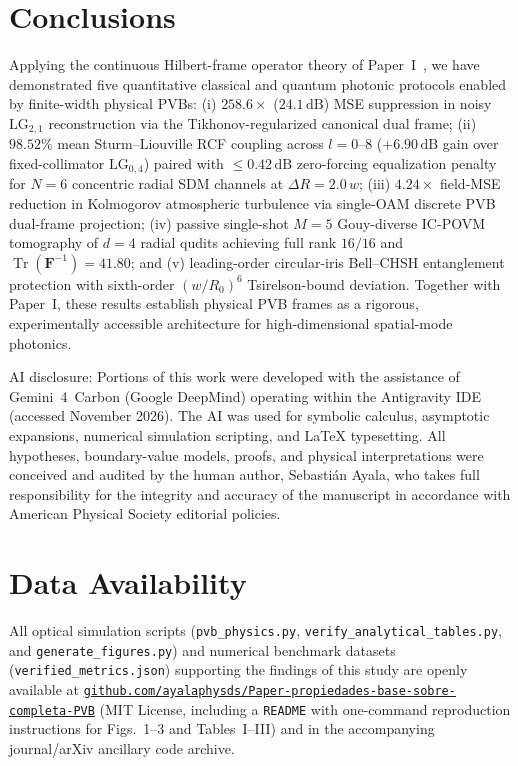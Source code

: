 \documentclass[aps,pra,onecolumn,notitlepage,11pt,tightenlines,nofootinbib,floatfix,longbibliography]{revtex4-2}
\begin{document}
\section{Conclusions}
\label{sec:conclusions}

Applying the continuous Hilbert-frame operator theory of Paper~I~\cite{AyalaPaperI}, we have demonstrated five quantitative classical and quantum photonic protocols enabled by finite-width physical PVBs: (i) $258.6\times$ ($24.1\,\mathrm{dB}$) MSE suppression in noisy $\mathrm{LG}_{2,1}$ reconstruction via the Tikhonov-regularized canonical dual frame; (ii) $98.52\%$ mean Sturm--Liouville RCF coupling across $l = 0\text{--}8$ ($+6.90\,\mathrm{dB}$ gain over fixed-collimator $\mathrm{LG}_{0,4}$) paired with $\le 0.42\,\mathrm{dB}$ zero-forcing equalization penalty for $N = 6$ concentric radial SDM channels at $\Delta R = 2.0\,w$; (iii) $4.24\times$ field-MSE reduction in Kolmogorov atmospheric turbulence via single-OAM discrete PVB dual-frame projection; (iv) passive single-shot $M = 5$ Gouy-diverse IC-POVM tomography of $d = 4$ radial qudits achieving full rank $16/16$ and $\operatorname{Tr}(\mathbf{F}^{-1}) = 41.80$; and (v) leading-order circular-iris Bell--CHSH entanglement protection with sixth-order $(w/R_0)^6$ Tsirelson-bound deviation. Together with Paper~I, these results establish physical PVB frames as a rigorous, experimentally accessible architecture for high-dimensional spatial-mode photonics.

\begin{acknowledgments}
AI disclosure: Portions of this work were developed with the assistance of Gemini~4~Carbon (Google DeepMind) operating within the Antigravity IDE (accessed November 2026). The AI was used for symbolic calculus, asymptotic expansions, numerical simulation scripting, and \LaTeX{} typesetting. All hypotheses, boundary-value models, proofs, and physical interpretations were conceived and audited by the human author, Sebasti\'an Ayala, who takes full responsibility for the integrity and accuracy of the manuscript in accordance with American Physical Society editorial policies.
\end{acknowledgments}

\section*{Data Availability}
{\sloppy All optical simulation scripts (\texttt{pvb\_\allowbreak physics.py}, \texttt{verify\_\allowbreak analytical\_\allowbreak tables.py}, and \texttt{generate\_\allowbreak figures.py}) and numerical benchmark datasets (\texttt{verified\_\allowbreak metrics.json}) supporting the findings of this study are openly available at \href{https://github.com/ayalaphysds/Paper-propiedades-base-sobre-completa-PVB}{\texttt{github.com/\allowbreak ayalaphysds/\allowbreak Paper-\allowbreak propiedades-\allowbreak base-\allowbreak sobre-\allowbreak completa-\allowbreak PVB}} (MIT License, including a \texttt{README} with one-command reproduction instructions for Figs.~1--3 and Tables~I--III) and in the accompanying journal/arXiv ancillary code archive.\par}
\end{document}

